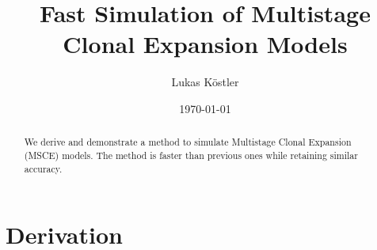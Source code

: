 \documentclass{amsart}
\numberwithin{equation}{section}
\begin{document}
\title{Fast Simulation of Multistage Clonal Expansion Models}


\author{Lukas K\"ostler}
\address{Technical University of Munich (TUM)}



\date{\today}


\begin{abstract}
We derive and demonstrate a method to simulate Multistage Clonal Expansion (MSCE) models. The method is faster than previous ones while retaining similar accuracy.
\end{abstract}

\maketitle


\section{Derivation}
\end{document}
